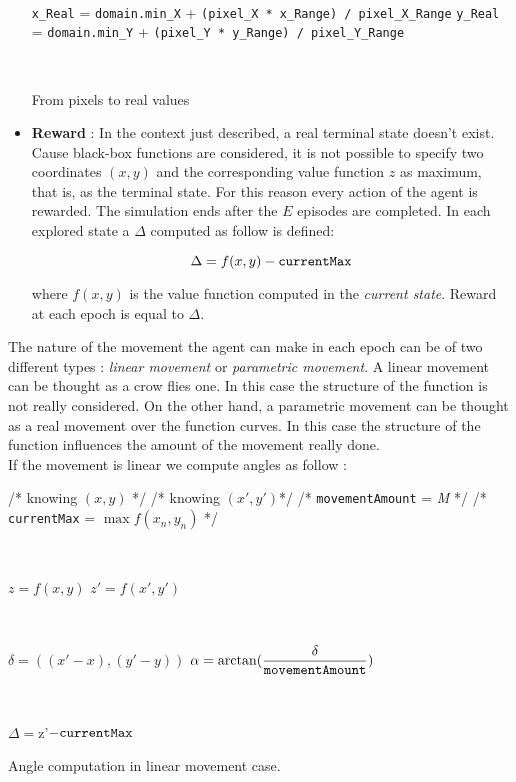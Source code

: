 \begin{itemize}
\begin{algorithm} [h!]
		\
		
		{\tt x\_Real} = {\tt domain.min\_X} + {\tt(pixel\_X * x\_Range) / pixel\_X\_Range} \;
		{\tt y\_Real} = {\tt domain.min\_Y} + {\tt (pixel\_Y * y\_Range) / pixel\_Y\_Range} \;
		
		\
		
		\caption{From pixels to real values} 
		\label{algoPixel}
	\end{algorithm}
	
	\item \textbf{Reward} : In the context just described, a real terminal state doesn't exist. Cause black-box functions are considered, it is not possible to specify two coordinates $(x, y)$ and the corresponding value function $z$ as maximum, that is, as the terminal state. For this reason every action of the agent is rewarded. The simulation ends after the $E$ episodes are completed.
	In each explored state a $\Delta$ computed as follow is defined: 
	
	\begin{equation}
		\Delta = f(x, y) - {\tt currentMax}
	\end{equation} 
	
	where $f(x, y)$ is the value function computed in the  \textit{current state}. Reward at each epoch is equal to $\Delta$.
	
\end{itemize}

The nature of the movement the agent can make in each epoch can be of two different types : \textit{linear movement} or \textit{parametric movement}. A linear movement can be thought as a crow flies one. In this case the structure of the function is not really considered. On the other hand, a parametric movement can be thought as a real movement over the function curves. In this case the structure of the function influences the amount of the movement really done. \\

If the movement is linear we compute angles as follow :

\begin{algorithm}
	/* knowing $(x, y)$ */ \;
	/* knowing $(x', y')$*/ \;
	/* {\tt movementAmount} = \textit{M} */ \;
	/* {\tt currentMax} = $\max f(x_n, y_n)$ */ \;
	
	
	\
	
	$z = f(x, y)$ \;
	$z' = f(x', y')$\;
	
	\
	
	$\delta = ((x'-x),  (y'-y))$ \;
	$\alpha = \arctan(\dfrac{\delta}{\tt movementAmount})$
	 
	 \
	 
	 $\Delta = $z'$ - {\tt currentMax} $
	 
	 \caption{Angle computation in linear movement case.} 
	
\end{algorithm}

